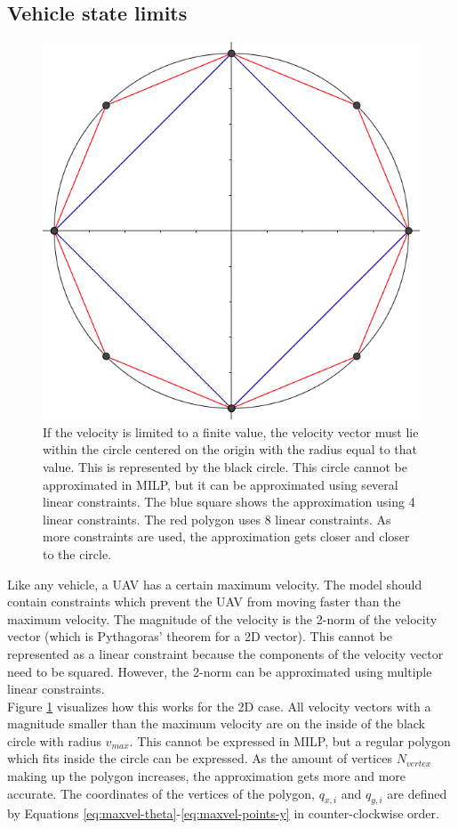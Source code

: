 \subsection{Vehicle state limits}
\begin{figure}
    \centering
        \includegraphics[width=0.5\columnwidth]{img/circlelinear}
    \caption{If the velocity is limited to a finite value, the velocity vector must lie within the circle centered on the origin with the radius equal to that value. This is represented by the black circle. This circle cannot be approximated in MILP, but it can be approximated using several linear constraints. The blue square shows the approximation using 4 linear constraints. The red polygon uses 8 linear constraints. As more constraints are used, the approximation gets closer and closer to the circle. }\label{fig:circlelinear}
\end{figure}
Like any vehicle, a UAV has a certain maximum velocity. The model should contain constraints which prevent the UAV from moving faster than the maximum velocity. The magnitude of the velocity is the 2-norm of the velocity vector (which is Pythagoras' theorem for a 2D vector). This cannot be represented as a linear constraint because the components of the velocity vector need to be squared. However, the 2-norm can be approximated using multiple linear constraints. \\
Figure \ref{fig:circlelinear} visualizes how this works for the 2D case. All velocity vectors with a magnitude smaller than the maximum velocity are on the inside of the black circle with radius $v_{max}$. This cannot be expressed in MILP, but a regular polygon which fits inside the circle can be expressed. As the amount of vertices $N_{vertex}$ making up the polygon increases, the approximation gets more and more accurate. The coordinates of the vertices of the polygon, $q_{x,i}$ and $q_{y,i}$ are defined by Equations \ref{eq:maxvel-theta}-\ref{eq:maxvel-points-y} in counter-clockwise order.

